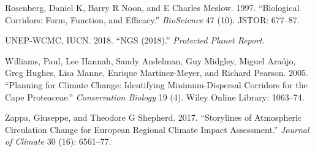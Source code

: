 \documentclass[]{article}
\begin{document}
\leavevmode\hypertarget{ref-rosenberg1997biological}{}%
Rosenberg, Daniel K, Barry R Noon, and E Charles Meslow. 1997. ``Biological Corridors: Form, Function, and Efficacy.'' \emph{BioScience} 47 (10). JSTOR: 677--87.

\leavevmode\hypertarget{ref-unep2018ngs}{}%
UNEP-WCMC, IUCN. 2018. ``NGS (2018).'' \emph{Protected Planet Report}.

\leavevmode\hypertarget{ref-williams2005planning}{}%
Williams, Paul, Lee Hannah, Sandy Andelman, Guy Midgley, Miguel Araújo, Greg Hughes, Lisa Manne, Enrique Martinez-Meyer, and Richard Pearson. 2005. ``Planning for Climate Change: Identifying Minimum-Dispersal Corridors for the Cape Proteaceae.'' \emph{Conservation Biology} 19 (4). Wiley Online Library: 1063--74.

\leavevmode\hypertarget{ref-zappa2017storylines}{}%
Zappa, Giuseppe, and Theodore G Shepherd. 2017. ``Storylines of Atmospheric Circulation Change for European Regional Climate Impact Assessment.'' \emph{Journal of Climate} 30 (16): 6561--77.
\end{document}
